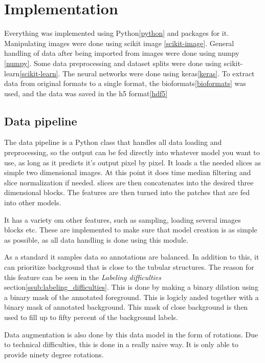 \section{Implementation} %
\label{sec:implementation}
Everything was implemented using Python\ref{python} and packages for it.
Manipulating images were done using scikit image \ref{scikit-image}.
General handling of data after being imported from images were done using numpy \ref{numpy}.
Some data preprocessing and dataset splits were done using scikit-learn\ref{scikit-learn}.
The neural networks were done using keras\ref{keras}.
To extract data from original formats to a single format, the bioformats\ref{bioformats} was used, and the data was saved in the h5 format\ref{hdf5}

\subsection{Data pipeline} %
\label{sub:data_pipeline}
The data pipeline is a Python class that handles all data loading and preprocessing, so the output can be fed directly into whatever model you want to use, as long as it predicts it's output pixel by pixel.
It loads a the needed slices as simple two dimensional images.
At this point it does time median filtering and slice normalization if needed.
slices are then concatenates into the desired three dimensional blocks.
The features are then turned into the patches that are fed into other models.

It has a variety om other features, such as sampling, loading several images blocks etc.
These are implemented to make sure that model creation is as simple as possible, as all data handling is done using this module.

As a standard it samples data so annotations are balanced.
In addition to this, it can prioritize background that is close to the tubular structures.
The reason for this feature can be seen in the \textit{Labeling difficulties} section\ref{ssub:labeling_difficulties}.
This is done by making a binary dilation using a binary mask of the annotated foreground.
This is logicly anded together with a binary mask of annotated background.
This mask of close background is then used to fill up to fifty percent of the background labels.

Data augmentation is also done by this data model in the form of rotations.
Due to technical difficulties, this is done in a really naive way.
It is only able to provide ninety degree rotations.

